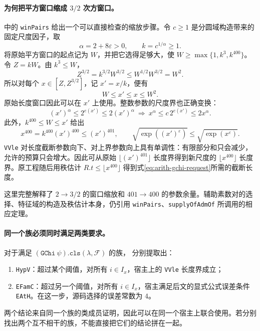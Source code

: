 \documentclass[UTF8,fontset=fandol,a4paper,openany,oneside]{ctexbook}
\theoremstyle{definition}
\theoremstyle{remark}
\begin{document}
\paragraph{为何把平方窗口缩成 $3/2$ 次方窗口。}
 中的 \texttt{winPairs} 给出一个可以直接检查的缩放步骤。令 $c\ge1$ 是分圆域构造带来的固定尺度因子，取
\[
\alpha=2+8\varepsilon>0,\qquad k=c^{1/\alpha}\ge1.
\]
将原始平方窗口的起点记为 $W$，并把它选得足够大，使
$W\ge\max\{1,k^3,k^{400}\}$。令 $Z=kW$。由 $k^3\le W$，
\[
Z^{3/2}=k^{3/2}W^{3/2}\le W^{1/2}W^{3/2}=W^2.
\]
所以对每个 $x\in[Z,Z^{3/2}]$，记 $x'=x/k$，便有
\[
W\le x'\le x\le W^2.
\]
原始长度窗口因此可以在 $x'$ 上使用。整数参数的尺度界也正确变换：
\[
(x')^\alpha\le2^{e(x')}\le2(x')^\alpha
\ \Longrightarrow\
x^\alpha\le c\,2^{e(x')}\le2x^\alpha.
\]
此外，$k^{400}\le W\le x'$ 给出
\[
x^{400}=k^{400}(x')^{400}\le(x')^{401},
\qquad
\sqrt{\exp((x')^\varepsilon)}\le\sqrt{\exp(x^\varepsilon)}.
\]
\texttt{VVle} 对长度截断参数向下、对上界参数向上具有单调性：有限部分和只会减少，允许的预算只会增大。因此可从原始 $\lfloor(x')^{401}\rfloor$ 长度界得到新尺度的 $\lfloor x^{400}\rfloor$ 长度界。原工程随后用秩估计 $R.t\le\lfloor x^{400}\rfloor$ 得到式\eqref{eq:arith-gchi-request}所需的截断长度。

这里完整解释了 $2\to3/2$ 的窗口缩放和 $401\to400$ 的参数余量。辅助素数对的选择、特征域的构造及秩估计本身，仍引用 \texttt{winPairs}、\texttt{supplyOfAdmOf} 所调用的相应定理。

\paragraph{同一个族必须同时满足两类要求。}
对于满足 $(\texttt{GChi}\ \psi).\texttt{cls}(\lambda,\mathcal F)$ 的族， 分别提取出：
\begin{enumerate}
\item \texttt{HypV}：超过某个阈值，对所有 $i\in I_x$，宿主上的 \texttt{VVle} 长度界成立；
\item \texttt{EFamC}：超过另一个阈值，对所有 $i\in I_x$，宿主满足后文的显式公式误差条件 \texttt{EAtH}。在这一步，源码选择的误差常数为 $4$。
\end{enumerate}
两个结论来自同一个族的类成员证明，因此可以在同一个宿主上联合使用。若分别找出两个互不相干的族，不能直接把它们的结论拼在一起。
\end{document}
